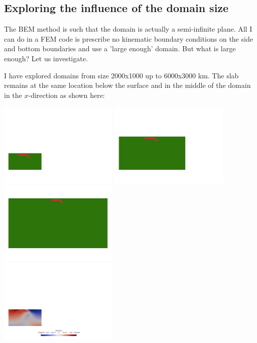 \newpage
\subsection*{Exploring the influence of the domain size}

The BEM method is such that the domain is actually a semi-infinite plane.
All I can do in a FEM code is prescribe no kinematic boundary conditions on the side and bottom 
boundaries and use a 'large enough' domain. But what is large enough? Let us investigate.

I have explored domains from size 2000x1000 up to 6000x3000 km. 
The slab remains at the same location below the surface and in the middle of the domain
in the $x$-direction as shown here:
\begin{center}
\includegraphics[width=5.7cm]{python_codes/fieldstone_55/gamma001/small}
\includegraphics[width=5.7cm]{python_codes/fieldstone_55/gamma001/mid}
\includegraphics[width=5.7cm]{python_codes/fieldstone_55/gamma001/large}\\
\includegraphics[width=5.7cm]{python_codes/fieldstone_55/gamma100/vx_small}

\end{center}
